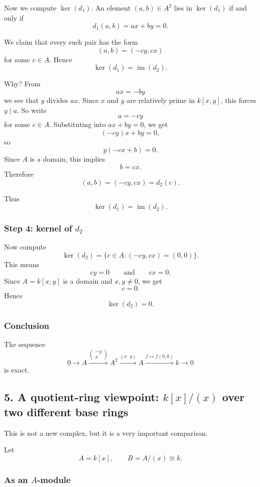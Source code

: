 \documentclass[12pt,a4paper]{article}
\theoremstyle{notespace}
\theoremstyle{definition}
\begin{document}
Now we compute \(\ker(d_1)\). An element \((a,b)\in A^2\) lies in \(\ker(d_1)\) if and only if
\[
d_1(a,b)=ax+by=0.
\]

We claim that every such pair has the form
\[
(a,b)=(-cy,cx)
\]
for some \(c\in A\). Hence
\[
\ker(d_1)=\operatorname{im}(d_2).
\]

Why? From
\[
ax=-by
\]
we see that \(y\) divides \(ax\). Since \(x\) and \(y\) are relatively prime in \(k[x,y]\), this forces \(y\mid a\). So write
\[
a=-cy
\]
for some \(c\in A\). Substituting into \(ax+by=0\), we get
\[
(-cy)x+by=0,
\]
so
\[
y(-cx+b)=0.
\]
Since \(A\) is a domain, this implies
\[
b=cx.
\]
Therefore
\[
(a,b)=(-cy,cx)=d_2(c).
\]

Thus
\[
\ker(d_1)=\operatorname{im}(d_2).
\]

\subsubsection*{Step 4: kernel of \(d_2\)}

Now compute
\[
\ker(d_2)=\{c\in A : (-cy,cx)=(0,0)\}.
\]
This means
\[
cy=0 \qquad\text{and}\qquad cx=0.
\]
Since \(A=k[x,y]\) is a domain and \(x,y\neq 0\), we get
\[
c=0.
\]
Hence
\[
\ker(d_2)=0.
\]

\subsubsection*{Conclusion}

The sequence
\[
0 \longrightarrow A \xrightarrow{\begin{pmatrix}-y\\x\end{pmatrix}} A^2
\xrightarrow{(x\;\;y)} A \xrightarrow{f\mapsto f(0,0)} k \longrightarrow 0
\]
is exact.

\bigskip

\subsection{5. A quotient-ring viewpoint: \(k[x]/(x)\) over two different base rings}

This is not a new complex, but it is a very important comparison.

Let
\[
A=k[x], \qquad B=A/(x)\cong k.
\]

\subsubsection*{As an \(A\)-module}
\end{document}

